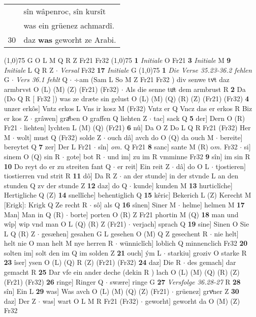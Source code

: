 \documentclass[8pt,a4paper,notitlepage]{article}
\begin{document}
\begin{table}[ht]
\begin{minipage}[t]{0.5\linewidth}
\begin{tabular}{rl}
 & sîn wâpenroc, sîn kursît\\ 
 & was ein grüenez achmardî.\\ 
30 & daz \textbf{was} geworht ze Arabi.\\ 
\end{tabular}
\scriptsize
\line(1,0){75} \newline
G O L M Q R Z Fr21 Fr32 \newline
\line(1,0){75} \newline
\textbf{1} \textit{Initiale} O Fr21  \textbf{3} \textit{Initiale} M  \textbf{9} \textit{Initiale} L Q R Z   $\cdot$ \textit{Versal} Fr32  \textbf{17} \textit{Initiale} G  \newline
\line(1,0){75} \newline
\textbf{1} \textit{Die Verse 35.23-36.2 fehlen} G   $\cdot$ \textit{Vers 36.1 fehlt} Q   $\cdot$ ÷am (Sam L So M Z Fr21 Fr32 ) div senwe tvͦt daz armbrvst O (L) (M) (Z) (Fr21) (Fr32)  $\cdot$ Als die senne tuͦt dem armbrust R \textbf{2} Da (Do Q R [ Fr32 ]) was ze dræte sin gelust O (L) (M) (Q) (R) (Z) (Fr21) (Fr32) \textbf{4} unzer erkôs] Vntz erkos L Vns ir kosz M (Fr32) Vntz er Q Vncz das er erkos R Biz er kos Z  $\cdot$ grâwen] graͦben O graffen Q liehten Z  $\cdot$ tac] sack Q \textbf{5} der] Dern O (R) Fr21  $\cdot$ liehten] lychten L (M) (Q) (Fr21) \textbf{6} nû] Da O Z Do L Q R Fr21 (Fr32) Her M  $\cdot$ wolt] must Q (Fr32) solde Z  $\cdot$ ouch dâ] avch do O (Q) da ouch M  $\cdot$ bereite] bereytet Q \textbf{7} zer] Der L Fr21  $\cdot$ sîn] \textit{om.} Q Fr21 \textbf{8} sanc] sante M (R) o\textit{m. } Fr32  $\cdot$ si] sinem O (Q) sin R  $\cdot$ gote] bot R  $\cdot$ und im] zu im R vmminne Fr32 \textbf{9} sîn] im sin R \textbf{10} Do reyt do er zu streiten fant Q  $\cdot$ er reit] Ein reit Z  $\cdot$ dâ] do O L  $\cdot$ tjostieren] tiostierren vnd strit R \textbf{11} dô] Da R Z  $\cdot$ an der stunde] in der stvnde L an den stunden Q zv der stunde Z \textbf{12} daz] do Q  $\cdot$ kunde] kunden M \textbf{13} hurticlîche] Hertigliche Q (Z) \textbf{14} snellîche] behentiglich Q \textbf{15} kêric] Bekerich L (Z) Kerecht M [Erigk]: Krigk Q Ze recht R  $\cdot$ sô] als Q \textbf{16} sînen] Siner M  $\cdot$ helme] helmen M \textbf{17} Man] Man in Q (R)  $\cdot$ borte] porten O (R) Z Fr21 phortin M (Q) \textbf{18} man und wîp] wip vnd man O L (Q) (R) Z (Fr21)  $\cdot$ verjach] sprach Q \textbf{19} sine] Sinen O Sie L Q (R) Z  $\cdot$ gesæhen] gesahen G L gesehen O (M) Q Z gesechent R  $\cdot$ nie helt] helt nie O man helt M nye herren R  $\cdot$ wünniclîch] loblich Q minnenclich Fr32 \textbf{20} solten im] solt den im Q im solden Z \textbf{21} ouch] ým L  $\cdot$ starkiu] groziv O starke R \textbf{23} îser] ysen O (L) (Q) R (Z) (Fr21) (Fr32) \textbf{24} daz] Die R  $\cdot$ des gemach] dar gemacht R \textbf{25} Dar vfe ein ander deche (dekin R ) lach O (L) (M) (Q) (R) (Z) (Fr21) (Fr32) \textbf{26} ringe] Ringer Q  $\cdot$ swære] ringe G \textbf{27} \textit{Versfolge 36.28-27} R  \textbf{28} sîn] Ein L \textbf{29} was] Was avch O (L) (M) (Q) (Z) (Fr21)  $\cdot$ grüenez] grvͤner Z \textbf{30} daz] Der Z  $\cdot$ was] wart O L M R Fr21 (Fr32)  $\cdot$ geworht] geworht da O (M) (Z) Fr32 
\end{minipage}
\end{table}
\end{document}
